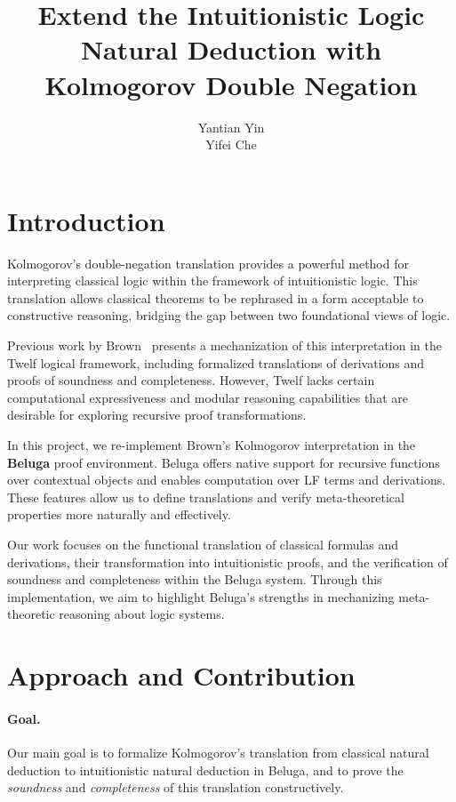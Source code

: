 \documentclass{article}
\title{Extend the Intuitionistic Logic Natural Deduction with Kolmogorov Double Negation}
\author{Yantian Yin \\ Yifei Che}
\date{}
\begin{document}
\maketitle

\section{Introduction}

Kolmogorov's double-negation translation provides a powerful method for interpreting classical logic within the framework of intuitionistic logic. This translation allows classical theorems to be rephrased in a form acceptable to constructive reasoning, bridging the gap between two foundational views of logic. 

Previous work by Brown~\cite{brown1998kolmogorov} presents a mechanization of this interpretation in the Twelf logical framework, including formalized translations of derivations and proofs of soundness and completeness. However, Twelf lacks certain computational expressiveness and modular reasoning capabilities that are desirable for exploring recursive proof transformations.

In this project, we re-implement Brown's Kolmogorov interpretation in the \textbf{Beluga} proof environment. Beluga offers native support for recursive functions over contextual objects and enables computation over LF terms and derivations. These features allow us to define translations and verify meta-theoretical properties more naturally and effectively.

Our work focuses on the functional translation of classical formulas and derivations, their transformation into intuitionistic proofs, and the verification of soundness and completeness within the Beluga system. Through this implementation, we aim to highlight Beluga’s strengths in mechanizing meta-theoretic reasoning about logic systems.

\section{Approach and Contribution}

\paragraph{Goal.} Our main goal is to formalize Kolmogorov's translation from classical natural deduction to intuitionistic natural deduction in Beluga, and to prove the \textit{soundness} and \textit{completeness} of this translation constructively.
\end{document}
